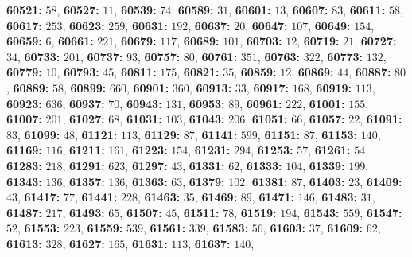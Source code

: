 \textsf{\bfseries 60521:} $58$, \textsf{\bfseries 60527:} $11$, \textsf{\bfseries 60539:} $74$, \textsf{\bfseries 60589:} $31$, \textsf{\bfseries 60601:} $13$, \textsf{\bfseries 60607:} $83$, \textsf{\bfseries 60611:} $58$, \textsf{\bfseries 60617:} $253$, \textsf{\bfseries 60623:} $259$, \textsf{\bfseries 60631:} $192$, \textsf{\bfseries 60637:} $20$, \textsf{\bfseries 60647:} $107$, \textsf{\bfseries 60649:} $154$, \textsf{\bfseries 60659:} $6$, \textsf{\bfseries 60661:} $221$, \textsf{\bfseries 60679:} $117$, \textsf{\bfseries 60689:} $101$, \textsf{\bfseries 60703:} $12$, \textsf{\bfseries 60719:} $21$, \textsf{\bfseries 60727:} $34$, \textsf{\bfseries 60733:} $201$, \textsf{\bfseries 60737:} $93$, \textsf{\bfseries 60757:} $80$, \textsf{\bfseries 60761:} $351$, \textsf{\bfseries 60763:} $322$, \textsf{\bfseries 60773:} $132$, \textsf{\bfseries 60779:} $10$, \textsf{\bfseries 60793:} $45$, \textsf{\bfseries 60811:} $175$, \textsf{\bfseries 60821:} $35$, \textsf{\bfseries 60859:} $12$, \textsf{\bfseries 60869:} $44$, \textsf{\bfseries 60887:} $80$, \textsf{\bfseries 60889:} $58$, \textsf{\bfseries 60899:} $660$, \textsf{\bfseries 60901:} $360$, \textsf{\bfseries 60913:} $33$, \textsf{\bfseries 60917:} $168$, \textsf{\bfseries 60919:} $113$, \textsf{\bfseries 60923:} $636$, \textsf{\bfseries 60937:} $70$, \textsf{\bfseries 60943:} $131$, \textsf{\bfseries 60953:} $89$, \textsf{\bfseries 60961:} $222$, \textsf{\bfseries 61001:} $155$, \textsf{\bfseries 61007:} $201$, \textsf{\bfseries 61027:} $68$, \textsf{\bfseries 61031:} $103$, \textsf{\bfseries 61043:} $206$, \textsf{\bfseries 61051:} $66$, \textsf{\bfseries 61057:} $22$, \textsf{\bfseries 61091:} $83$, \textsf{\bfseries 61099:} $48$, \textsf{\bfseries 61121:} $113$, \textsf{\bfseries 61129:} $87$, \textsf{\bfseries 61141:} $599$, \textsf{\bfseries 61151:} $87$, \textsf{\bfseries 61153:} $140$, \textsf{\bfseries 61169:} $116$, \textsf{\bfseries 61211:} $161$, \textsf{\bfseries 61223:} $154$, \textsf{\bfseries 61231:} $294$, \textsf{\bfseries 61253:} $57$, \textsf{\bfseries 61261:} $54$, \textsf{\bfseries 61283:} $218$, \textsf{\bfseries 61291:} $623$, \textsf{\bfseries 61297:} $43$, \textsf{\bfseries 61331:} $62$, \textsf{\bfseries 61333:} $104$, \textsf{\bfseries 61339:} $199$, \textsf{\bfseries 61343:} $136$, \textsf{\bfseries 61357:} $136$, \textsf{\bfseries 61363:} $63$, \textsf{\bfseries 61379:} $102$, \textsf{\bfseries 61381:} $87$, \textsf{\bfseries 61403:} $23$, \textsf{\bfseries 61409:} $43$, \textsf{\bfseries 61417:} $77$, \textsf{\bfseries 61441:} $228$, \textsf{\bfseries 61463:} $35$, \textsf{\bfseries 61469:} $89$, \textsf{\bfseries 61471:} $146$, \textsf{\bfseries 61483:} $31$, \textsf{\bfseries 61487:} $217$, \textsf{\bfseries 61493:} $65$, \textsf{\bfseries 61507:} $45$, \textsf{\bfseries 61511:} $78$, \textsf{\bfseries 61519:} $194$, \textsf{\bfseries 61543:} $559$, \textsf{\bfseries 61547:} $52$, \textsf{\bfseries 61553:} $223$, \textsf{\bfseries 61559:} $539$, \textsf{\bfseries 61561:} $339$, \textsf{\bfseries 61583:} $56$, \textsf{\bfseries 61603:} $37$, \textsf{\bfseries 61609:} $62$, \textsf{\bfseries 61613:} $328$, \textsf{\bfseries 61627:} $165$, \textsf{\bfseries 61631:} $113$, \textsf{\bfseries 61637:} $140$, 
